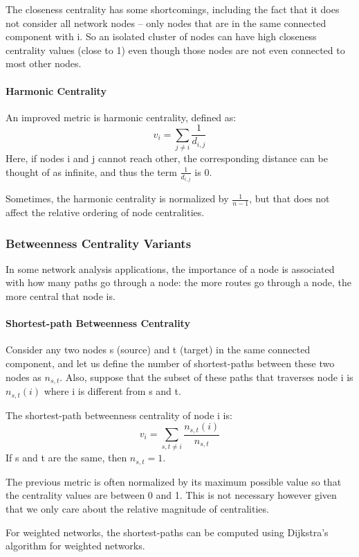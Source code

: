 \documentclass[11pt]{scrartcl} %
\begin{document}
The closeness centrality has some shortcomings, including the fact that it does not consider all network nodes – only nodes that are in the same connected component with i. So an isolated cluster of nodes can have high closeness centrality values (close to 1) even though those nodes are not even connected to most other nodes.

\paragraph{Harmonic Centrality}
An improved metric is harmonic centrality, defined as:
\[ v_i = \sum_{j \neq i} \frac{1}{d_{i,j}} \] 
Here, if nodes i and j cannot reach other, the corresponding distance can be thought of as infinite, and thus the term $ \frac{1}{d_{i,j}} $ is 0.

Sometimes, the harmonic centrality is normalized by $\frac{1}{n-1}$, but that does not affect the relative ordering of node centralities.

\subsubsection{Betweenness Centrality Variants}
In some network analysis applications, the importance of a node is associated with how many paths go through a node: the more routes go through a node, the more central that node is.

\paragraph{Shortest-path Betweenness Centrality}
Consider any two nodes s (source) and t (target) in the same connected component, and let us define the number of shortest-paths between these two nodes as $n_{s,t}$. Also, suppose that the subset of these paths that traverses node i is $n_{s,t}(i)$ where i is different from s and t.

The shortest-path betweenness centrality of node i is:
\[ v_i = \sum_{s,t \neq i} \frac{n_{s,t}(i)}{n_{s,t}} \] 
If s and t are the same, then $n_{s,t}=1$.

The previous metric is often normalized by its maximum possible value so that the centrality values are between 0 and 1. This is not necessary however given that we only care about the relative magnitude of centralities.

For weighted networks, the shortest-paths can be computed using Dijkstra’s algorithm for weighted networks.
\end{document}
